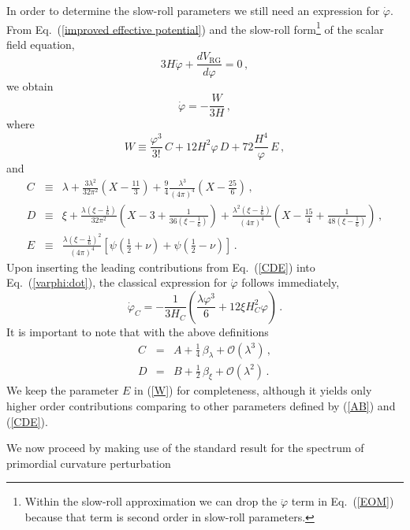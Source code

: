 \documentclass[aps,12pt,superscriptaddress,preprintnumbers,
                secnumarabic,nofootinbib,showpacs]{revtex4}
\begin{document}
In order to determine the slow-roll parameters we still need
an expression for $\dot{\varphi}$.
 From Eq.~(\ref{improved effective potential}) and the slow-roll
form\footnote{Within the slow-roll approximation we can drop the
$\ddot{\varphi}$ term in Eq.~(\ref{EOM}) because that term is second
order in slow-roll parameters.} of the scalar field equation,
\begin{equation}
3H\dot{\varphi} + \frac{dV_{\mathrm{RG}}}{d\varphi} =
0\,,\label{EOM}
\end{equation}
we obtain
\begin{equation}
\dot{\varphi} = - \frac{W}{3H}
\,,
\label{varphi:dot}
\end{equation}
where
\begin{equation}
W \equiv \frac{\varphi^3}{3!}\, C + 12H^2\varphi\, D
+72\frac{H^4}{\varphi}\, E\,,
\label{W}
\end{equation}
and
\begin{eqnarray}
 C & \equiv & \lambda + \frac{3\lambda^2}{32\pi^2}\left(X-\frac{11}{3}\right) + \frac{9}{4}\frac{\lambda^3}{(4\pi)^4}\left(X-\frac{25}{6}\right)\,,\nonumber\\
 D & \equiv & \xi
 +\frac{\lambda(\xi-\frac16)}{32\pi^2}\left(X-3+\frac{1}{36(\xi-\frac16)}\right)+\frac{\lambda^2(\xi-\frac16)}{(4\pi)^4}\left(X-\frac{15}{4}+\frac{1}{48(\xi-\frac16)} \right)\,,\nonumber\\
 E & \equiv & \frac{\lambda(\xi-\frac16)^2}{(4\pi)^4}\left[\psi\left(\frac12+\nu\right) +
  \psi\left(\frac12-\nu\right)\right]\,.
\label{CDE}
\end{eqnarray}
Upon inserting the leading contributions from
Eq.~(\ref{CDE}) into Eq.~(\ref{varphi:dot}),
 the classical expression for $\dot{\varphi}$ follows immediately,
\begin{equation}
\dot{\varphi}_C =
-\frac{1}{3H_C}\left(\frac{\lambda\varphi^3}{6}+12\xi
H^2_C\varphi\right)
\,.
\end{equation}
It is important to note that with the above definitions
\begin{eqnarray}
C & = & A + \frac14\,\beta_{\lambda} + \mathcal{O}(\lambda^3)\,,\nonumber\\
D & = & B + \frac12\,\beta_{\xi} + \mathcal{O}(\lambda^2)\,.
\end{eqnarray}
We keep the parameter $E$ in (\ref{W}) for completeness, although it
yields only higher order contributions comparing to other
parameters defined by (\ref{AB}) and (\ref{CDE}).

We now proceed by making use of the standard result for the spectrum
of primordial curvature perturbation~\cite{Liddle:2000cg}
\end{document}
